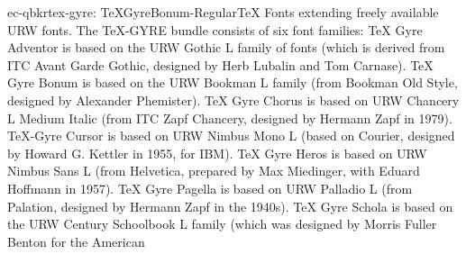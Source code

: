 \documentclass{ddltxtyp}
\begin{document}
\begin{package}{ec-qbkr}{tex-gyre: TeXGyreBonum-Regular}{{\TeX} Fonts extending freely available URW fonts.}
The {\TeX}-GYRE bundle consists of six font families: {\TeX} Gyre
Adventor is based on the URW Gothic L family of fonts (which is
derived from ITC Avant Garde Gothic, designed by Herb Lubalin
and Tom Carnase). {\TeX} Gyre Bonum is based on the URW Bookman L
family (from Bookman Old Style, designed by Alexander
Phemister). {\TeX} Gyre Chorus is based on URW Chancery L Medium
Italic (from ITC Zapf Chancery, designed by Hermann Zapf in
1979). {\TeX}-Gyre Cursor is based on URW Nimbus Mono L (based on
Courier, designed by Howard G. Kettler in 1955, for IBM). {\TeX}
Gyre Heros is based on URW Nimbus Sans L (from Helvetica,
prepared by Max Miedinger, with Eduard Hoffmann in 1957). {\TeX}
Gyre Pagella is based on URW Palladio L (from Palation,
designed by Hermann Zapf in the 1940s). {\TeX} Gyre Schola is
based on the URW Century Schoolbook L family (which was
designed by Morris Fuller Benton for the American %
\end{package}
\end{document}
